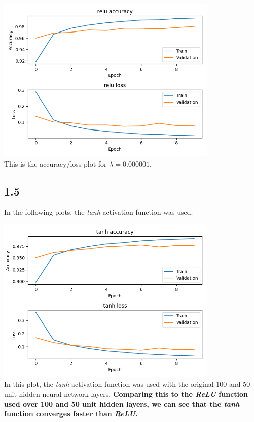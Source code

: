 \documentclass[a4paper,14pt]{extarticle}
\begin{document}
\begin{center}
\includegraphics[width=400]{Figure_1_lambda_000001.png}\\
This is the accuracy/loss plot for $\lambda = 0.000001$.
\end{center}
\subsection*{1.5}
In the following plots, the \textit{tanh} activation function was used.  
\begin{center}
\includegraphics[width=400]{tanh_learn_100_50.png}\\
In this plot, the \textit{tanh} activation function was used with the original 100 and 50 unit hidden neural network layers. \textbf{Comparing this to the \textit{ReLU} function used over 100 and 50 unit hidden layers, we can see that the \textit{tanh} function converges faster than \textit{ReLU}.}
\end{center}
\end{document}
